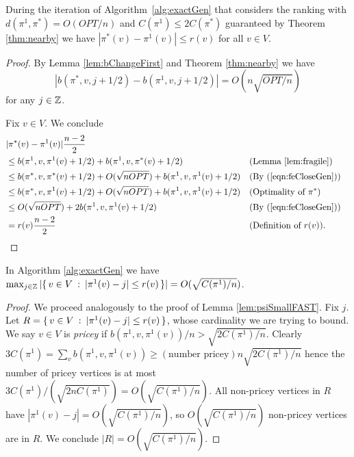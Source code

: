 \documentclass[envcountsame,oribibl]{llncs}
\begin{document}
\begin{lemma}\label{lem:feCloseGen}
During the iteration of Algorithm~\ref{alg:exactGen} that considers the ranking with $d(\pi^1,\pi^*)=O(OPT/n)$ and $C(\pi^1) \le 2C(\pi^*)$ guaranteed by Theorem \ref{thm:nearby} we have  $|\pi^*(v) - \pi^1(v)| \le r(v)$ for all $v \in V$.
\end{lemma}
\begin{proof}
By Lemma \ref{lem:bChangeFirst} and Theorem \ref{thm:nearby} we have 
\begin{equation}
|b(\pi^*, v, j + 1/2) - b(\pi^1, v, j +1/2)| = O( n\sqrt{OPT / n}) \label{eqn:feCloseGen}
\end{equation}
for any $j \in \mathbb{Z}$.

Fix $v \in V$. We conclude
\begin{align*}
\lefteqn{|\pi^*(v) - \pi^1(v)|\frac{n-2}{2}} \\
&\le b(\pi^1, v, \pi^1(v) + 1/2) + b(\pi^1, v, \pi^*(v) + 1/2) && \text{(Lemma \ref{lem:fragile})}\\
 &\le b(\pi^*, v, \pi^*(v) + 1/2) + O(\sqrt{nOPT}) + b(\pi^1, v, \pi^1(v) + 1/2)&& \text{(By (\ref{eqn:feCloseGen}))} \\
 &\le b(\pi^*, v, \pi^1(v) + 1/2) + O(\sqrt{nOPT}) + b(\pi^1, v, \pi^1(v) + 1/2) && \text{(Optimality of }\pi^*\text{)} \\
&\le O( \sqrt{nOPT}) + 2b(\pi^1, v, \pi^1(v) + 1/2) && \text{(By (\ref{eqn:feCloseGen}))} \\
& = r(v)\frac{n-2}{2} && \text{(Definition of $r(v)$)}
.\end{align*}
\end{proof}

\begin{lemma}\label{lem:psiSmallGen}
In Algorithm \ref{alg:exactGen} we have  $\max_{j \in \mathbb{Z}} |\{\,{v \in V}\::\:{|\pi^1(v) - j| \le r(v)}\,\}| = O(\sqrt{C(\pi^1) / n})$.
\end{lemma}
\begin{proof}
We proceed analogously to the proof of Lemma \ref{lem:psiSmallFAST}.
Fix $j$. Let $R = \{\,{v \in V}\::\:{|\pi^1(v) - j| \le r(v)}\,\}$, whose cardinality we are trying to bound. We say $v \in V$ is \emph{pricey} if $b(\pi^1,v,\pi^1(v))/n > \sqrt{2C(\pi^1)/n}$. Clearly $3 C(\pi^1) = \sum_v b(\pi^1, v, \pi^1(v)) \ge (\text{number pricey}) n \sqrt{2C(\pi^1)/n}$ hence the number of pricey vertices is at most $3C(\pi^1)/(\sqrt{2 n C(\pi^1)})=O(\sqrt{C(\pi^1)/n})$. All non-pricey vertices in $R$ have $|\pi^1(v) - j| = O(\sqrt{C(\pi^1) / n})$, so $O(\sqrt{C(\pi^1) / n})$ non-pricey vertices are in $R$. We conclude $|R| = O(\sqrt{C(\pi^1) / n})$.
\end{proof}
\end{document}
